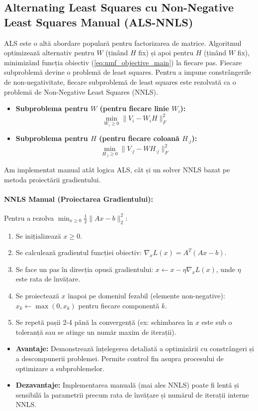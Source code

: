 \documentclass[12pt,a4paper]{article}
\begin{document}
	\subsection{Alternating Least Squares cu Non-Negative Least Squares Manual (ALS-NNLS)}
	ALS este o altă abordare populară pentru factorizarea de matrice. Algoritmul optimizează alternativ pentru $W$ (ținând $H$ fix) și apoi pentru $H$ (ținând $W$ fix), minimizând funcția obiectiv (\ref{eq:nmf_objective_main}) la fiecare pas. Fiecare subproblemă devine o problemă de least squares. Pentru a impune constrângerile de non-negativitate, fiecare subproblemă de least squares este rezolvată ca o problemă de Non-Negative Least Squares (NNLS).
	\begin{itemize}
		\item \textbf{Subproblema pentru $W$ (pentru fiecare linie $W_i$):}
		$$ \min_{W_i \ge 0} \| V_i - W_i H \|_F^2 $$
		\item \textbf{Subproblema pentru $H$ (pentru fiecare coloană $H_{\cdot j}$):}
		$$ \min_{H_{\cdot j} \ge 0} \| V_{\cdot j} - W H_{\cdot j} \|_F^2 $$ 
	\end{itemize}
	Am implementat manual atât logica ALS, cât și un solver NNLS bazat pe metoda proiectării gradientului.
	\paragraph{NNLS Manual (Proiectarea Gradientului):}
	Pentru a rezolva $\min_{x \ge 0} \frac{1}{2}\|Ax - b\|_2^2$:
	\begin{enumerate}
		\item Se inițializează $x \ge 0$.
		\item Se calculează gradientul funcției obiectiv: $\nabla_x L(x) = A^T (Ax - b)$.
		\item Se face un pas în direcția opusă gradientului: $x \leftarrow x - \eta \nabla_x L(x)$, unde $\eta$ este rata de învățare.
		\item Se proiectează $x$ înapoi pe domeniul fezabil (elemente non-negative): $x_k \leftarrow \max(0, x_k)$ pentru fiecare componentă $k$.
		\item Se repetă pașii 2-4 până la convergență (ex: schimbarea în $x$ este sub o toleranță sau se atinge un număr maxim de iterații).
	\end{enumerate}
	\begin{itemize}
		\item \textbf{Avantaje:} Demonstrează înțelegerea detaliată a optimizării cu constrângeri și a descompunerii problemei. Permite control fin asupra procesului de optimizare a subproblemelor.
		\item \textbf{Dezavantaje:} Implementarea manuală (mai ales NNLS) poate fi lentă și sensibilă la parametrii precum rata de învățare și numărul de iterații interne NNLS.
	\end{itemize}
\end{document}
